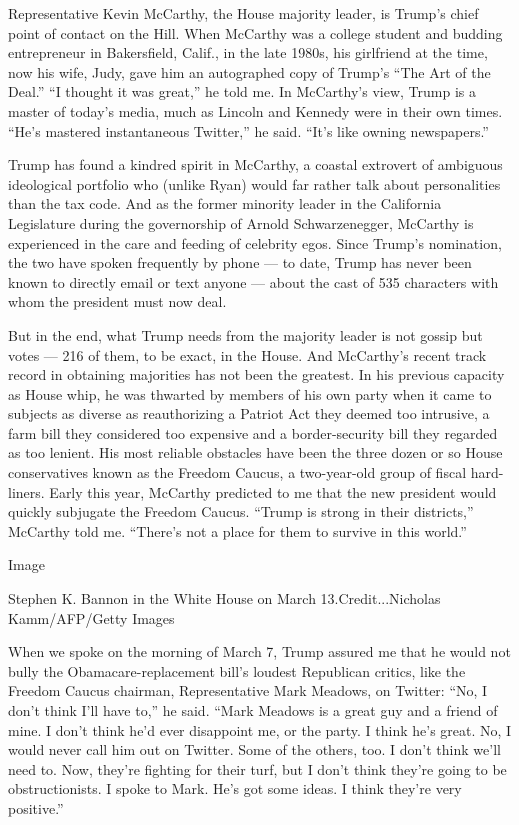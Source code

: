 Representative Kevin McCarthy, the House majority leader, is Trump's
chief point of contact on the Hill. When McCarthy was a college student
and budding entrepreneur in Bakersfield, Calif., in the late 1980s, his
girlfriend at the time, now his wife, Judy, gave him an autographed copy
of Trump's ``The Art of the Deal.'' ``I thought it was great,'' he told
me. In McCarthy's view, Trump is a master of today's media, much as
Lincoln and Kennedy were in their own times. ``He's mastered
instantaneous Twitter,'' he said. ``It's like owning newspapers.''

Trump has found a kindred spirit in McCarthy, a coastal extrovert of
ambiguous ideological portfolio who (unlike Ryan) would far rather talk
about personalities than the tax code. And as the former minority leader
in the California Legislature during the governorship of Arnold
Schwarzenegger, McCarthy is experienced in the care and feeding of
celebrity egos. Since Trump's nomination, the two have spoken frequently
by phone --- to date, Trump has never been known to directly email or
text anyone --- about the cast of 535 characters with whom the president
must now deal.

But in the end, what Trump needs from the majority leader is not gossip
but votes --- 216 of them, to be exact, in the House. And McCarthy's
recent track record in obtaining majorities has not been the greatest.
In his previous capacity as House whip, he was thwarted by members of
his own party when it came to subjects as diverse as reauthorizing a
Patriot Act they deemed too intrusive, a farm bill they considered too
expensive and a border-security bill they regarded as too lenient. His
most reliable obstacles have been the three dozen or so House
conservatives known as the Freedom Caucus, a two-year-old group of
fiscal hard-liners. Early this year, McCarthy predicted to me that the
new president would quickly subjugate the Freedom Caucus. ``Trump is
strong in their districts,'' McCarthy told me. ``There's not a place for
them to survive in this world.''

Image

Stephen K. Bannon in the White House on March 13.Credit...Nicholas
Kamm/AFP/Getty Images

When we spoke on the morning of March 7, Trump assured me that he would
not bully the Obamacare-replacement bill's loudest Republican critics,
like the Freedom Caucus chairman, Representative Mark Meadows, on
Twitter: ``No, I don't think I'll have to,'' he said. ``Mark Meadows is
a great guy and a friend of mine. I don't think he'd ever disappoint me,
or the party. I think he's great. No, I would never call him out on
Twitter. Some of the others, too. I don't think we'll need to. Now,
they're fighting for their turf, but I don't think they're going to be
obstructionists. I spoke to Mark. He's got some ideas. I think they're
very positive.''

